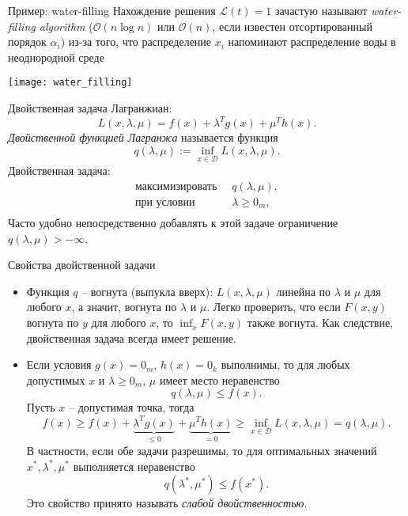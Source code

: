 \documentclass[10pt]{beamer}
\begin{document}
\begin{frame}{Пример: water-filling}
Нахождение решения $\mathcal{L}(t)=1$ зачастую называют \textit{water-filling algorithm} ($\mathcal{O}(n\log n)$ или $\mathcal{O}(n)$, если известен отсортированный порядок $\alpha_i$) из-за того, что распределение $x_i$ напоминают распределение воды в неоднородной среде\\
\begin{center}
\texttt{[image: water\_filling]}
\end{center}
\end{frame}

\begin{frame}{Двойственная задача}
Лагранжиан:
$$
L(x, \lambda, \mu)=f(x)+\lambda^Tg(x)+\mu^Th(x).
$$ 
\textit{Двойственной функцией Лагранжа} называется функция
$$
q(\lambda, \mu) := \inf_{x\in \mathcal{D}}L(x, \lambda, \mu).
$$
Двойственная задача:
$$
\begin{array}{ll}
\mbox{максимизировать } &~ q(\lambda, 
\mu), \\
\mbox{при условии } &~ \lambda\geq 0_m, \\
\end{array}
$$
Часто удобно непосредственно добавлять к этой задаче ограничение $q(\lambda, \mu)>-\infty$.
\end{frame}

\begin{frame}{Свойства двойственной задачи}
\begin{itemize}
\item Функция $q$ -- вогнута (выпукла вверх): $L(x, \lambda, \mu)$ линейна по $\lambda$ и $\mu$ для любого $x$, а значит, вогнута по $\lambda$ и $\mu$. Легко проверить, что если $F(x, y)$ вогнута по $y$ для любого $x$, то $\inf_xF(x, y)$ также вогнута. Как следствие, двойственная задача всегда имеет решение.
\item Если условия $g(x)=0_m$, $h(x)=0_k$ выполнимы, то для любых допустимых $x$ и $\lambda\geq 0_m$, $\mu$ имеет место неравенство
$$
q(\lambda, \mu)\leq f(x).
$$
Пусть $x$ -- допустимая точка, тогда
$$
f(x)\geq f(x)+\underbrace{\lambda^Tg(x)}_{\leq 0}+\underbrace{\mu^Th(x)}_{=0}\geq \inf_{x\in\mathcal{D}}L(x, \lambda, \mu)=q(\lambda, \mu).
$$
В частности, если обе задачи разрешимы, то для оптимальных значений $x^*, \lambda^*, \mu^*$ выполняется неравенство
$$
q(\lambda^*, \mu^*)\leq f(x^*).
$$
Это свойство принято называть \textit{слабой двойственностью}.
\end{itemize}
\end{frame}
\end{document}
